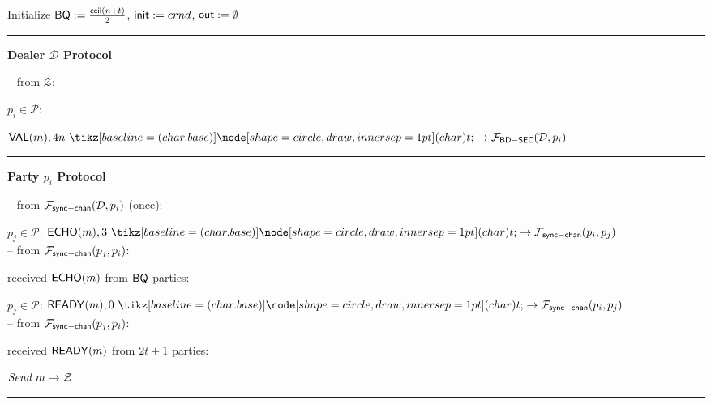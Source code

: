 \begin{bbox}[title={$\Pi_{\msf{Bracha}} (\mathcal{D}, \mathcal{P} = p_1,...,p_n)$ in $\F_{\msf{sync-chan}}$-hybrid}]

Initialize ${\mathsf {BQ}} := \frac{{\mathsf {ceil}}(n+t)}{2}$, ${\mathsf {init}} := crnd$, ${\mathsf {out}} := \emptyset$

\vspace{2mm} \hrule \vspace{2mm}

{\bf Dealer $\mathcal{D}$ Protocol}

-- \OnInput {} from $\mathcal{Z}$:

	\qquad \For $p_i \in \mathcal{P}$:

		\qquad \quad \Send $\msf{VAL}(m),4n \token \rightarrow \Fsync{\mathcal{D}}{p_i}$

\vspace{2mm} \hrule \vspace{2mm}

{\bf Party $p_i$ Protocol}

-- \OnInput {} from $\mathcal{F}_{{\mathsf {sync-chan}}}(\mathcal{D},p_i)$ (once):

	\qquad \For $p_j \in \mathcal{P}$: \Send $\msf{ECHO}(m), 3 \token \rightarrow \Fchan{p_i}{p_j}$\\

-- \OnInput {} from $\mathcal{F}_{{\mathsf {sync-chan}}}(p_j,p_i)$:

	\qquad \If received ${\mathsf {ECHO}}(m)$ from ${\mathsf {BQ}}$ parties:

		\qquad \quad \For $p_j \in \mathcal{P}$: \Send $\msf{READY}(m), 0 \token \rightarrow \Fchan{p_i}{p_j}$ \\

-- \OnInput {} from $\mathcal{F}_{{\mathsf {sync-chan}}}(p_j,p_i)$:

	\qquad \If received ${\mathsf {READY}}(m)$ from $2t+1$ parties:

		\qqquad $\emph{Send}~ m \rightarrow \mathcal{Z}$

\vspace{2mm} \hrule \vspace{2mm}

\end{bbox}

